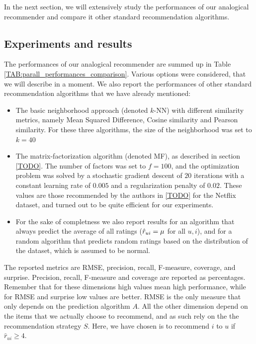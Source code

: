 In the next section, we will extensively study the performances of our
analogical recommender and compare it other standard recommendation algorithms.

\subsection{Experiments and results}
\label{results}

The performances of our analogical recommender are summed up in Table
\ref{TAB:parall_performances_comparison}. Various options were considered, that
we will describe in a moment. We also report the performances of other standard
recommendation algorithms that we have already mentioned:
\begin{itemize}
  \item The basic neighborhood approach (denoted $k$-NN) with different
    similarity metrics, namely Mean Squared Difference, Cosine similarity and
    Pearson similarity.  For these three algorithms, the size of the
    neighborhood was set to $k=40$
  \item The matrix-factorization algorithm (denoted MF), as described in section \ref{TODO}.
    The number of factors was set to $f = 100$, and the optimization problem
    was solved by a stochastic gradient descent of $20$ iterations with
    a constant learning rate of $0.005$ and a regularization penalty of $0.02$.
    These values are those recommended by the authors in \ref{TODO} for the
    Netflix dataset, and turned out to be quite efficient for our experiments.
  \item For the sake of completness we also report results for an algorithm
    that always predict the average of all ratings ($\hat{r}_{ui} = \mu$ for all
    $u, i$), and for a random algorithm that predicts random ratings based on
    the distribution of the dataset, which is assumed to be normal.
\end{itemize}

The reported metrics are RMSE, precision, recall, F-measure, coverage, and
surprise. Precision, recall, F-measure and coverage  are reported as
percentages. Remember that for these dimensions high values mean high
performance, while for RMSE and surprise low values are better.  RMSE is the
only measure that only depends on the prediction algorithm $A$. All the other
dimension depend on the items that we actually choose to recommend, and as such
rely on the the recommendation strategy $S$. Here, we have chosen is to
recommend $i$ to $u$ if $\hat{r}_{ui} \geq 4$.

